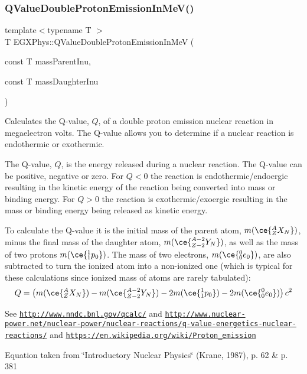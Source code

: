 \subsubsection{\texorpdfstring{Q\+Value\+Double\+Proton\+Emission\+In\+Me\+V()}{QValueDoubleProtonEmissionInMeV()}}
{\footnotesize\ttfamily template$<$typename T $>$ \\
T E\+G\+X\+Phys\+::\+Q\+Value\+Double\+Proton\+Emission\+In\+MeV (\begin{DoxyParamCaption}\item[{const T}]{mass\+Parent\+Inu,  }\item[{const T}]{mass\+Daughter\+Inu }\end{DoxyParamCaption})}



Calculates the Q-\/value, $Q$, of a double proton emission nuclear reaction in megaelectron volts. The Q-\/value allows you to determine if a nuclear reaction is endothermic or exothermic. 

The Q-\/value, $Q$, is the energy released during a nuclear reaction. The Q-\/value can be positive, negative or zero. For $Q < 0$ the reaction is endothermic/endoergic resulting in the kinetic energy of the reaction being converted into mass or binding energy. For $Q > 0$ the reaction is exothermic/exoergic resulting in the mass or binding energy being released as kinetic energy.

To calculate the Q-\/value it is the initial mass of the parent atom, $m(\ce{ ^{A}_{Z}X_{N} })$, minus the final mass of the daughter atom, $m(\ce{ ^{A-2}_{Z-2}Y_{N} })$, as well as the mass of two protons $m(\ce{ ^{1}_{1}p_{0} })$. The mass of two electrons, $m(\ce{ ^{0}_{0}e_{0} })$, are also subtracted to turn the ionized atom into a non-\/ionized one (which is typical for these calculations since ionized mass of atoms are rarely tabulated)\+: \[Q = \left ( m(\ce{ ^{A}_{Z}X_{N} })-m(\ce{ ^{A-2}_{Z-2}Y_{N} })-2m(\ce{ ^{1}_{1}p_{0} })-2m(\ce{ ^{0}_{0}e_{0} }) \right) c^2\]

See \href{http://www.nndc.bnl.gov/qcalc/}{\tt http\+://www.\+nndc.\+bnl.\+gov/qcalc/} and \href{http://www.nuclear-power.net/nuclear-power/nuclear-reactions/q-value-energetics-nuclear-reactions/}{\tt http\+://www.\+nuclear-\/power.\+net/nuclear-\/power/nuclear-\/reactions/q-\/value-\/energetics-\/nuclear-\/reactions/} and \href{https://en.wikipedia.org/wiki/Proton_emission}{\tt https\+://en.\+wikipedia.\+org/wiki/\+Proton\+\_\+emission}

Equation taken from \char`\"{}\+Introductory Nuclear Physics\char`\"{} (Krane, 1987), p. 62 \& p. 381


